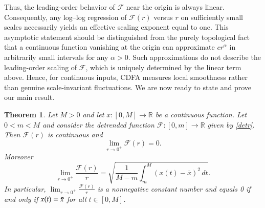 \documentclass{amsart}
\newtheorem{theorem}{Theorem}[section]
\newcommand{\R}{{\mathbb{R}}}
\begin{document}
Thus, the leading-order behavior of $\mathcal F$ near the origin is always linear. Consequently, any log--log regression of $\mathcal{F}(r)$ versus $r$ on sufficiently small scales necessarily yields an effective scaling exponent equal to one. This asymptotic statement should be distinguished from the purely topological fact that a continuous function vanishing at the origin can approximate $c r^\alpha$ in arbitrarily small intervals for any $\alpha>0$. Such approximations do not describe the leading-order scaling of $\mathcal F$, which is uniquely determined by the linear term above. Hence, for continuous inputs, CDFA measures local smoothness rather than genuine scale-invariant fluctuations. 
We are now ready to state and prove our main result.
\begin{theorem}\label{poteF}
    Let $M>0$ and let $x\colon [0,M]\rightarrow \R$ be a continuous function.  Let $0<m<M$ and consider the detrended function $\mathcal{F}:[0,m]\rightarrow \R$ given by \eqref{detr}.
Then $\mathcal{F}(r)$ is continuous and    
\begin{equation*}
   \lim_{r\to 0^+} \mathcal{F}(r)=0.
\end{equation*}
Moreover
\begin{equation}\label{asym}
    \lim_{r\to 0^+} \frac{\mathcal{F}(r)}{r} =\sqrt{\frac{1}{M-m}\int_{m}^{M}\left(x\left(t\right)-\overline{x}\right)^2\, dt}.
\end{equation}
In particular, $\lim_{r\to 0^+} \frac{\mathcal{F}(r)}{r}$ is a nonnegative constant number and equals 0 if and only if $x(t)=\Bar{x}$ for all $t\in[0,M]$.
\end{theorem}
\end{document}
